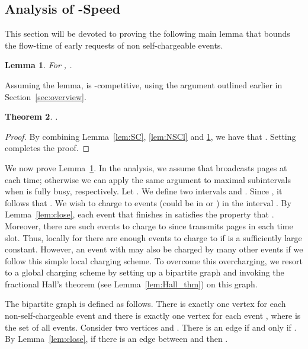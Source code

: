 \documentclass[11pt]{article}
\newtheorem{lemma}{Lemma}[section]
\newtheorem{theorem}[lemma]{Theorem}
\begin{document}
\begin{titlepage}
\subsection{Analysis of -Speed}\vspace{-2mm}
\label{sec:5speed}

This section will be devoted to proving the following main lemma that
bounds the flow-time of early requests of non self-chargeable events.

\begin{lemma}
  \label{lem:5speedNSC} For , .
\end{lemma}

Assuming the lemma,  is -competitive, using the argument
outlined earlier in Section~\ref{sec:overview}.
\begin{theorem}
  \label{thm:5spd}
    .
\end{theorem}

\begin{proof}

\iffalse
 Set  and combine Lemma~\ref{lem:SC}, \ref{lem:NSCl} and \ref{lem:5speedNSC}.

\fi

By combining Lemma~\ref{lem:SC}, \ref{lem:NSCl} and
\ref{lem:5speedNSC}, we have that . Setting  completes the proof.
\end{proof}

We now prove Lemma~\ref{lem:5speedNSC}. In the analysis, we assume that  broadcasts  pages at each time;
otherwise we can apply the same argument to maximal subintervals when  is fully busy, respectively. 
Let . We define
two intervals  and .  Since , it follows that .  We wish to charge  to
events (could be in  or ) in the interval . By
Lemma~\ref{lem:close}, each event  that finishes in
 satisfies the property that . Moreover, there are 
such events to charge to since  transmits  pages in each
time slot.  Thus, locally for  there are enough events to
charge to if  is a sufficiently large constant.  However, an
event  with  may also be charged by
many other events if we follow this simple local charging scheme. To
overcome this overcharging, we resort to a global charging scheme by
setting up a bipartite graph  and invoking the fractional Hall's
theorem (see Lemma~\ref{lem:Hall_thm}) on this graph.

The bipartite graph  is defined as follows.  There is
exactly one vertex  for each non-self-chargeable event
 and there is exactly one vertex  for
each event , where  is the set of all events. Consider two vertices  and
. There is an edge  if and only
if .  By Lemma~\ref{lem:close}, if there is an
edge between  and  then .


\end{titlepage}
\end{document}
